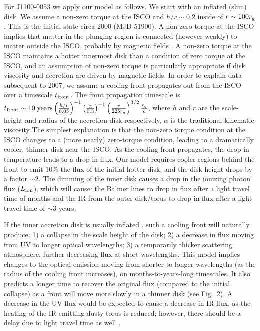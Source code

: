 \documentclass{nature}
\begin{document}
For J1100-0053 we apply our model as follows. We start with an inflated (slim) disk. We assume a non-zero torque at the ISCO and $h/r\sim0.2$ inside of $r\sim100 r_{\rm g}$. This is the initial state circa 2000 (MJD 51900). A non-zero torque at the ISCO implies that matter in the plunging region is connected (however weakly) to matter outside the ISCO, probably by magnetic fields \cite[e.g., ][]{Gammie1999, Agol_Krolik2000}. A non-zero torque at the ISCO maintains a hotter innermost disk than a condition of zero torque at the ISCO, and an assumption of non-zero torque is particularly appropriate if disk viscosity and accretion are driven by magnetic fields. In order to explain data subsequent to 2007, we assume a cooling front propagates out from the ISCO over a timescale $t_{\rm front}$. The front propagation timescale is $ t_{\rm front}  \sim  10 \; {\rm years} \left(\frac{h/r}{0.05}\right)^{-1}  \left(\frac{\alpha}{0.3}\right)^{-1}   \left(\frac{r}{225r_{g}}\right)^{3/2}  \frac{r_{g}}{c}$, where $h$ and $r$ are the scale-height and radius of the accretion disk respectively, $\alpha$ is the traditional kinematic viscosity
The simplest explanation is that the non-zero torque condition at the ISCO changes to a (more nearly) zero-torque condition, leading to a dramatically cooler, thinner disk near the ISCO. As the cooling front propagates, the drop in temperature leads to a drop in flux. Our model requires cooler regions behind the front to emit 10\% the flux of the initial hotter disk, and the disk height drops by a factor $\sim$2. The dimming of the inner disk causes a drop in the ionizing photon flux ($L_{\rm ion}$), which will cause: the Balmer lines to drop in flux after a light travel time of months and the IR from the outer disk/torus to drop in flux after a light travel time of $\sim$3 years.

If the inner accretion disk is usually inflated \cite[see e.g., ][]{Sirko_Goodman2003, Thompson2005, Hopkins_Quataert2011}, such a cooling front will naturally produce: 1) a collapse in the scale height of the disk; 2) a decrease in flux moving from UV to longer optical wavelengths; 3) a temporarily thicker scattering atmosphere, further decreasing flux at short wavelengths.  This model implies changes to the optical emission moving from shorter to longer wavelengths (as the radius of the cooling front increases), on months-to-years-long timescales. It also predicts a longer time to recover the original flux (compared to the initial collapse) as a front will move more slowly in a thinner disk (see Fig.~2). A decrease in the UV flux would be expected to cause a decrease in IR flux, as the heating of the IR-emitting dusty torus is reduced; however, there should be a delay due to light travel time as well \cite[e.g., ][]{Jun2015}.
\end{document}
